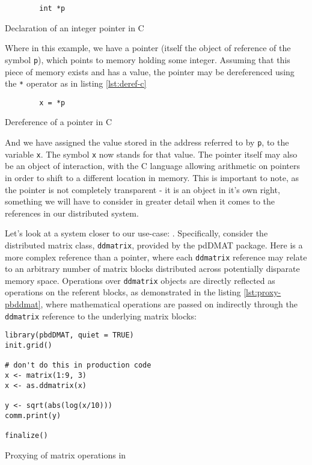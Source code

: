 \begin{listing}
    \begin{verbatim}
        int *p
    \end{verbatim}
    \caption{Declaration of an integer pointer in C}
    \label{lst:declare-int-pointer}
\end{listing}

Where in this example, we have a pointer (itself the object of reference
of the symbol \texttt{p}), which points to memory holding some integer.
Assuming that this piece of memory exists and has a value, the pointer
may be dereferenced using the \texttt{*} operator as in listing \cref{lst:deref-c}

\begin{listing}
    \begin{verbatim}
        x = *p
    \end{verbatim}
    \caption{Dereference of a pointer in C}
    \label{lst:deref-c}
\end{listing}

And we have assigned the value stored in the address referred to by
\texttt{p}, to the variable \texttt{x}. The symbol \texttt{x} now stands
for that value. The pointer itself may also be an object of interaction,
with the C language allowing arithmetic on pointers in order to shift to
a different location in memory. This is important to note, as the
pointer is not completely transparent - it is an object in it's own
right, something we will have to consider in greater detail when it
comes to the references in our distributed system.

Let's look at a system closer to our use-case: . Specifically,
consider the distributed matrix class, \texttt{ddmatrix}, provided by
the pdDMAT package. Here is a more complex reference than a pointer,
where each \texttt{ddmatrix} reference may relate to an arbitrary number
of matrix blocks distributed across potentially disparate memory space.
Operations over \texttt{ddmatrix} objects are directly reflected as
operations on the referent blocks, as demonstrated in the listing \cref{lst:proxy-pbddmat},
where mathematical operations are passed on indirectly through
the \texttt{ddmatrix} reference to the underlying matrix blocks:

\begin{listing}
    \begin{verbatim}
library(pbdDMAT, quiet = TRUE)
init.grid()

# don't do this in production code
x <- matrix(1:9, 3)
x <- as.ddmatrix(x)

y <- sqrt(abs(log(x/10)))
comm.print(y)

finalize()
    \end{verbatim}
    \caption{Proxying of matrix operations in }
    \label{lst:proxy-pbddmat}
\end{listing}


